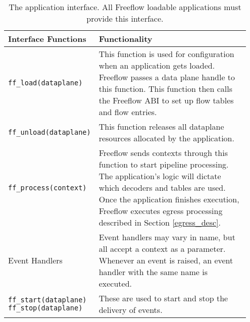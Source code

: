 \begin{table}[ht]
\caption{The application interface. All Freeflow loadable applications must provide this interface.}
\begin{center}
\begin{tabular}{| p{0.3\linewidth} | p{0.65\linewidth} |}
\hline
Interface Functions & Functionality \\

\hline

\texttt{ff\_load(dataplane)} & This function is used for configuration when an application gets loaded. Freeflow passes a data plane handle to this function. This function then calls the Freeflow ABI to set up flow tables and flow entries. \\

\hline

\texttt{ff\_unload(dataplane)} & This function releases all dataplane resources allocated by the application. \\

\hline

\texttt{ff\_process(context)} & Freeflow sends contexts through this function to start pipeline processing. The application's logic will dictate which decoders and tables are used. Once the application finishes execution, Freeflow executes egress processing described in Section \ref{egress_desc}. \\

\hline
Event Handlers & Event handlers may vary in name, but all accept a context as a parameter. Whenever an event is raised, an event handler with the same name is executed.\\
\hline

\texttt{ff\_start(dataplane)}
\texttt{ff\_stop(dataplane)}
 & These are used to start and stop the delivery of events. \\
 
\hline

\end{tabular}
\end{center}
\label{tbl:steve_api}
\end{table}

